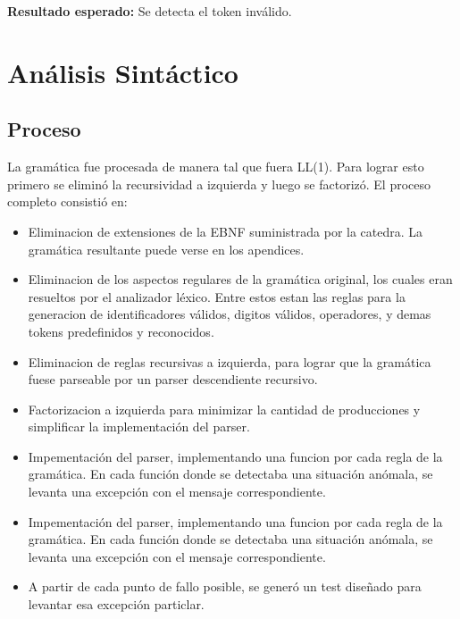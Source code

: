 \documentclass [a4paper,abstracton,titlepage]{scrartcl}
\begin{document}
\textbf{Resultado esperado:} Se detecta el token inválido.

\section{Análisis Sintáctico}

\hypertarget{_proceso}{}
\subsection{Proceso}
\label{_proceso}
La gramática fue procesada de manera tal que fuera LL(1). Para lograr
esto primero se eliminó la recursividad a izquierda y luego se
factorizó.
El proceso completo consistió en:
\begin{itemize}
 \item Eliminacion de extensiones de la EBNF suministrada por la catedra.
  La gramática resultante puede verse en los apendices.
 \item Eliminacion de los aspectos regulares de la gramática original, los cuales
  eran resueltos por el analizador léxico.
  Entre estos estan las reglas para la generacion de identificadores válidos,
  digitos válidos, operadores, y demas tokens predefinidos y reconocidos.
 \item Eliminacion de reglas recursivas a izquierda, para lograr que la gramática
  fuese parseable por un parser descendiente recursivo.
 \item Factorizacion a izquierda para minimizar la cantidad de producciones
  y simplificar la implementación del parser.
 \item Impementación del parser, implementando una funcion por cada regla de la
  gramática.
  En cada función donde se detectaba una situación anómala, se levanta una
  excepción con el mensaje correspondiente.
 \item Impementación del parser, implementando una funcion por cada regla de la
  gramática.
  En cada función donde se detectaba una situación anómala, se levanta una
  excepción con el mensaje correspondiente.
 \item A partir de cada punto de fallo posible, se generó un test diseñado para
  levantar esa excepción particlar.
\end{itemize}
\end{document}
